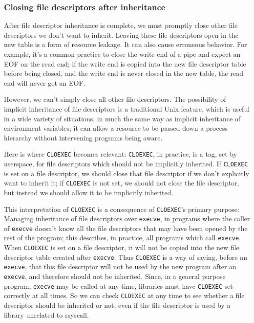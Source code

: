 \documentclass{acmart}
\begin{document}
\subsubsection{Closing file descriptors after inheritance}
After file descriptor inheritance is complete,
we must promptly close other file descriptors we don't want to inherit.
Leaving these file descriptors open in the new table is a form of resource leakage.
It can also cause erroneous behavior.
For example, it's a common practice to close the write end of a pipe
and expect an EOF on the read end;
if the write end is copied into the new file descriptor table before being closed,
and the write end is never closed in the new table,
the read end will never get an EOF.

However, we can't simply close all other file descriptors.
The possibility of implicit inheritance of file descriptors is a traditional Unix feature,
which is useful in a wide variety of situations,
in much the same way as implicit inheritance of environment variables;
it can allow a resource to be passed down a process hierarchy without intervening programs being aware.

Here is where \texttt{CLOEXEC} becomes relevant:
\texttt{CLOEXEC}, in practice,
is a tag, set by userspace, for file descriptors which should not be implicitly inherited.
If \texttt{CLOEXEC} is set on a file descriptor,
we should close that file descriptor if we don't explicitly want to inherit it;
if \texttt{CLOEXEC} is not set, we should not close the file descriptor,
but instead we should allow it to be implicitly inherited.

This interpretation of \texttt{CLOEXEC} is a consequence of \texttt{CLOEXEC}'s primary purpose:
Managing inheritance of file descriptors over \texttt{execve},
in programs where the caller of \texttt{execve}
doesn't know all the file descriptors that may have been opened by the rest of the program;
this describes, in practice, all programs which call \texttt{execve}.
When \texttt{CLOEXEC} is set on a file descriptor,
it will not be copied into the new file descriptor table created after \texttt{execve}.
Thus \texttt{CLOEXEC} is a way of saying, before an \texttt{execve},
that this file descriptor will not be used by the new program after an \texttt{execve},
and therefore should not be inherited.
Since, in a general purpose program, \texttt{execve} may be called at any time,
libraries must have \texttt{CLOEXEC} set correctly at all times.
So we can check \texttt{CLOEXEC} at any time to see whether a file descriptor should be inherited or not,
even if the file descriptor is used by a library unrelated to rsyscall.
\end{document}
